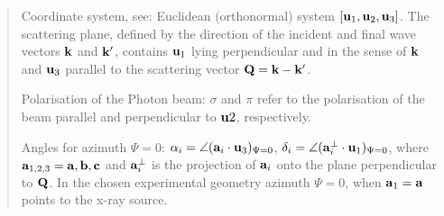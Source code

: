 \begin{quote}
\item[Coordinate system, see\cite{longfield02-054417}:] Euclidean (orthonormal) system 
$[\mathbf u_1,\mathbf u_2,\mathbf u_3]$. The scattering plane, defined by the
direction of the incident and final wave vectors  
$\mathbf k$ and $\mathbf k'$, contains $\mathbf u_1$ lying
perpendicular and in the sense of $\mathbf k$ and $\mathbf u_3$ parallel to the scattering
vector $\mathbf Q=\mathbf k-\mathbf k'$. 
\item[Polarisation of the Photon beam:] $\sigma$ and $\pi$ refer to the polarisation
of the beam parallel and perpendicular to $\mathbf u2$, respectively.
\item[Angles for azimuth $\Psi=0$:] $\alpha_i=\angle(\mathbf a_i \cdot \mathbf u_3)_{\Psi=0}$,
$\delta_i=\angle(\mathbf a_i^{\perp}\cdot \mathbf u_1)_{\Psi=0}$,
where $\mathbf a_{1,2,3}=\mathbf a,\mathbf b,\mathbf c$ and $\mathbf a_i^{\perp}$ is the projection of
$\mathbf a_i$ onto the plane perpendicular to $\mathbf Q$.
 In the chosen experimental geometry
azimuth $\Psi=0$, when $\mathbf a_1 = \mathbf a$ points to the x-ray source.
\end{quote}

